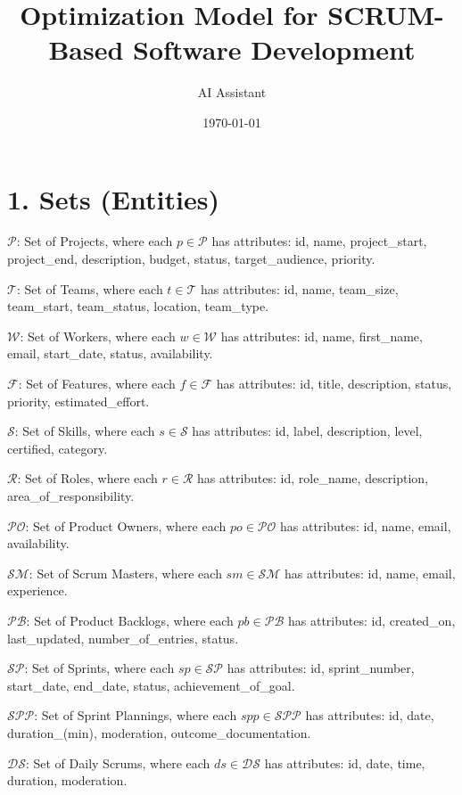 \documentclass[12pt]{article}
\title{\Huge Optimization Model for SCRUM-Based Software Development}
\author{\Large AI Assistant}
\date{\today}
\begin{document}
\maketitle
\tableofcontents
\newpage

\section{1. Sets (Entities)}

\item $\mathcal{P}$: Set of Projects, where each $p \in \mathcal{P}$ has attributes: id, name, project\_start, project\_end, description, budget, status, target\_audience, priority.
    \item $\mathcal{T}$: Set of Teams, where each $t \in \mathcal{T}$ has attributes: id, name, team\_size, team\_start, team\_status, location, team\_type.
    \item $\mathcal{W}$: Set of Workers, where each $w \in \mathcal{W}$ has attributes: id, name, first\_name, email, start\_date, status, availability.
    \item $\mathcal{F}$: Set of Features, where each $f \in \mathcal{F}$ has attributes: id, title, description, status, priority, estimated\_effort.
    \item $\mathcal{S}$: Set of Skills, where each $s \in \mathcal{S}$ has attributes: id, label, description, level, certified, category.
    \item $\mathcal{R}$: Set of Roles, where each $r \in \mathcal{R}$ has attributes: id, role\_name, description, area\_of\_responsibility.
    \item $\mathcal{PO}$: Set of Product Owners, where each $po \in \mathcal{PO}$ has attributes: id, name, email, availability.
    \item $\mathcal{SM}$: Set of Scrum Masters, where each $sm \in \mathcal{SM}$ has attributes: id, name, email, experience.
    \item $\mathcal{PB}$: Set of Product Backlogs, where each $pb \in \mathcal{PB}$ has attributes: id, created\_on, last\_updated, number\_of\_entries, status.
    \item $\mathcal{SP}$: Set of Sprints, where each $sp \in \mathcal{SP}$ has attributes: id, sprint\_number, start\_date, end\_date, status, achievement\_of\_goal.
    \item $\mathcal{SPP}$: Set of Sprint Plannings, where each $spp \in \mathcal{SPP}$ has attributes: id, date, duration\_(min), moderation, outcome\_documentation.
    \item $\mathcal{DS}$: Set of Daily Scrums, where each $ds \in \mathcal{DS}$ has attributes: id, date, time, duration, moderation.
\end{document}
